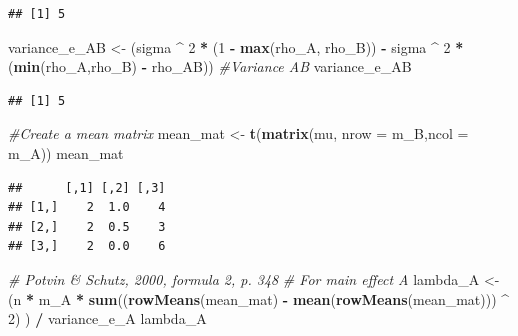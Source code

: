 \documentclass[]{book}
\newenvironment{Shaded}{\begin{snugshade}}{\end{snugshade}}
\newcommand{\CommentTok}[1]{\textcolor[rgb]{0.56,0.35,0.01}{\textit{#1}}}
\newcommand{\DataTypeTok}[1]{\textcolor[rgb]{0.13,0.29,0.53}{#1}}
\newcommand{\DecValTok}[1]{\textcolor[rgb]{0.00,0.00,0.81}{#1}}
\newcommand{\KeywordTok}[1]{\textcolor[rgb]{0.13,0.29,0.53}{\textbf{#1}}}
\newcommand{\NormalTok}[1]{#1}
\newcommand{\OperatorTok}[1]{\textcolor[rgb]{0.81,0.36,0.00}{\textbf{#1}}}
\newcommand{\StringTok}[1]{\textcolor[rgb]{0.31,0.60,0.02}{#1}}
\begin{document}
\begin{verbatim}
## [1] 5
\end{verbatim}

\begin{Shaded}
\begin{Highlighting}[]
\NormalTok{variance_e_AB <-}
\StringTok{  }\NormalTok{(sigma }\OperatorTok{^}\StringTok{ }\DecValTok{2} \OperatorTok{*}\StringTok{ }\NormalTok{(}\DecValTok{1} \OperatorTok{-}\StringTok{ }\KeywordTok{max}\NormalTok{(rho_A, rho_B)) }\OperatorTok{-}\StringTok{ }
\StringTok{     }\NormalTok{sigma }\OperatorTok{^}\StringTok{ }\DecValTok{2} \OperatorTok{*}\StringTok{ }\NormalTok{(}\KeywordTok{min}\NormalTok{(rho_A,rho_B) }\OperatorTok{-}\StringTok{ }\NormalTok{rho_AB)) }
\CommentTok{#Variance AB}
\NormalTok{variance_e_AB}
\end{Highlighting}
\end{Shaded}

\begin{verbatim}
## [1] 5
\end{verbatim}

\begin{Shaded}
\begin{Highlighting}[]
\CommentTok{#Create a mean matrix}
\NormalTok{mean_mat <-}\StringTok{ }\KeywordTok{t}\NormalTok{(}\KeywordTok{matrix}\NormalTok{(mu, }\DataTypeTok{nrow =}\NormalTok{ m_B,}\DataTypeTok{ncol =}\NormalTok{ m_A)) }
\NormalTok{mean_mat}
\end{Highlighting}
\end{Shaded}

\begin{verbatim}
##      [,1] [,2] [,3]
## [1,]    2  1.0    4
## [2,]    2  0.5    3
## [3,]    2  0.0    6
\end{verbatim}

\begin{Shaded}
\begin{Highlighting}[]
\CommentTok{# Potvin & Schutz, 2000, formula 2, p. 348}
\CommentTok{# For main effect A}
\NormalTok{lambda_A <-}
\StringTok{  }\NormalTok{(n }\OperatorTok{*}\StringTok{ }\NormalTok{m_A }\OperatorTok{*}\StringTok{ }\KeywordTok{sum}\NormalTok{((}\KeywordTok{rowMeans}\NormalTok{(mean_mat) }\OperatorTok{-}\StringTok{ }
\StringTok{                   }\KeywordTok{mean}\NormalTok{(}\KeywordTok{rowMeans}\NormalTok{(mean_mat))) }\OperatorTok{^}\StringTok{ }\DecValTok{2}\NormalTok{) ) }\OperatorTok{/}\StringTok{ }\NormalTok{variance_e_A}
\NormalTok{  lambda_A}
\end{Highlighting}
\end{Shaded}
\end{document}
